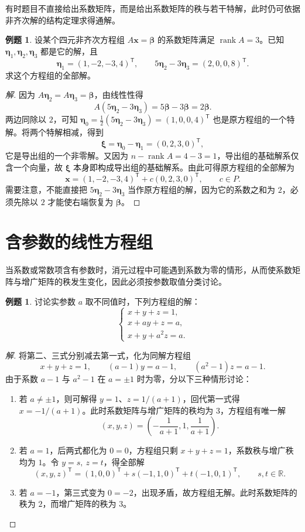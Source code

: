 \documentclass[UTF8, fontset=fandol, a4paper, 12pt]{ctexart}
\newcommand{\rank}{\operatorname{rank}}
\newcommand{\vx}{\boldsymbol{x}}
\newcommand{\vb}{\boldsymbol{\beta}}
\newcommand{\vxi}{\boldsymbol{\xi}}
\newcommand{\veta}{\boldsymbol{\eta}}
\theoremstyle{definition}
\newtheorem{example}[definition]{例题}
\begin{document}
有时题目不直接给出系数矩阵，而是给出系数矩阵的秩与若干特解，此时仍可依据非齐次解的结构定理求得通解。

\begin{example}
设某个四元非齐次方程组 $A\vx=\vb$ 的系数矩阵满足 $\rank A=3$。已知 $\veta_1,\veta_2,\veta_3$ 都是它的解，且
\[
 \veta_1=(1,-2,-3,4)^{\mathsf T},\qquad
 5\veta_2-3\veta_3=(2,0,0,8)^{\mathsf T}.
\]
求这个方程组的全部解。
\end{example}
\begin{proof}[解]
因为 $A\veta_2=A\veta_3=\vb$，由线性性得
\[
 A(5\veta_2-3\veta_3)=5\vb-3\vb=2\vb.
\]
两边同除以 $2$，可知 $\veta_0=\tfrac12(5\veta_2-3\veta_3)=(1,0,0,4)^{\mathsf T}$ 也是原方程组的一个特解。将两个特解相减，得到
\[
 \vxi=\veta_0-\veta_1=(0,2,3,0)^{\mathsf T},
\]
它是导出组的一个非零解。又因为 $n-\rank A=4-3=1$，导出组的基础解系仅含一个向量，故 $\vxi$ 本身即构成导出组的基础解系。由此可得原方程组的全部解为
\[
 \boxed{\vx=(1,-2,-3,4)^{\mathsf T}+c(0,2,3,0)^{\mathsf T},\qquad c\in P.}
\]
需要注意，不能直接把 $5\veta_2-3\veta_3$ 当作原方程组的解，因为它的系数之和为 $2$，必须先除以 $2$ 才能使右端恢复为 $\vb$。
\end{proof}

\section{含参数的线性方程组}

当系数或常数项含有参数时，消元过程中可能遇到系数为零的情形，从而使系数矩阵与增广矩阵的秩发生变化，因此必须按参数取值分类讨论。

\begin{example}
讨论实参数 $a$ 取不同值时，下列方程组的解：
\[
 \begin{cases}
 x+y+z=1,\\
 x+ay+z=a,\\
 x+y+a^2z=a.
 \end{cases}
\]
\end{example}
\begin{proof}[解]
将第二、三式分别减去第一式，化为同解方程组
\[
 x+y+z=1,\qquad (a-1)y=a-1,\qquad (a^2-1)z=a-1.
\]
由于系数 $a-1$ 与 $a^2-1$ 在 $a=\pm1$ 时为零，分以下三种情形讨论：
\begin{enumerate}
 \item 若 $a\ne\pm1$，则可解得 $y=1$、$z=1/(a+1)$，回代第一式得 $x=-1/(a+1)$。此时系数矩阵与增广矩阵的秩均为 $3$，方程组有唯一解
 \[
  (x,y,z)=\left(-\frac1{a+1},1,\frac1{a+1}\right).
 \]
 \item 若 $a=1$，后两式都化为 $0=0$，方程组只剩 $x+y+z=1$，系数秩与增广秩均为 $1$。令 $y=s,\ z=t$，得全部解
 \[
  (x,y,z)^{\mathsf T}=(1,0,0)^{\mathsf T}
  +s(-1,1,0)^{\mathsf T}+t(-1,0,1)^{\mathsf T},\qquad s,t\in\mathbb R.
 \]
 \item 若 $a=-1$，第三式变为 $0=-2$，出现矛盾，故方程组无解。此时系数矩阵的秩为 $2$，而增广矩阵的秩为 $3$。
\end{enumerate}
\end{proof}
\end{document}
